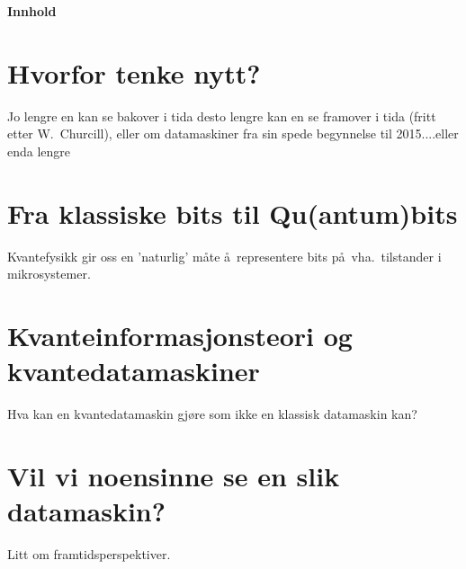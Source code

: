 
%
\setlength{\leftmargin}{4cm}
\newcommand{\bra}[1]{\left\langle #1 \right|}
\newcommand{\ket}[1]{\left| #1 \right\rangle}
\newcommand{\braket}[2]{\left\langle #1 \right| #2 \right\rangle}
\newcommand{\OP}[1]{{\bf\widehat{#1}}}
\newcommand{\matr}[1]{{\bf \cal{#1}}}
\pagestyle{empty}


\Large
\begin{center}
   \begin{minipage}{0.8\textwidth}
       \vspace*{0.5cm}
       \begin{center}
            { \LARGE \bf Innhold}
       \end{center}
\section*{Hvorfor tenke nytt?}
Jo lengre en kan se bakover i tida desto lengre kan en se 
framover i tida (fritt etter W.~Churcill), eller om 
datamaskiner fra sin spede begynnelse til 2015....eller enda lengre
\section*{Fra klassiske bits til {\bf Qu}(antum)bits}
Kvantefysikk  gir oss en 'naturlig' m\aa te \aa\ representere bits p\aa\
vha.~tilstander i mikrosystemer.  
\section*{Kvanteinformasjonsteori og kvantedatamaskiner}
Hva kan en kvantedatamaskin gj\o re som ikke en klassisk datamaskin
kan?

\section*{Vil vi noensinne se en slik datamaskin?}
Litt om framtidsperspektiver. 
\vspace{2cm}
\begin{center}
{\centering\mbox{
}}
\end{center}      

\end{minipage}
\end{center}

